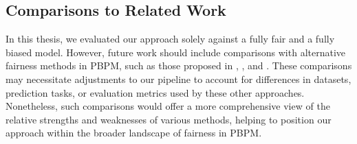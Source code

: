 \subsection{Comparisons to Related Work}
In this thesis, we evaluated our approach solely against a fully fair and a fully biased model.
However, future work should include comparisons with alternative fairness methods in PBPM,
such as those proposed in \cite{fairness_foundation}, \cite{fairness_adversarial}, and \cite{fairness_independence}.
These comparisons may necessitate adjustments to our pipeline to account for differences in datasets,
prediction tasks, or evaluation metrics used by these other approaches.
Nonetheless, such comparisons would offer a more comprehensive view
of the relative strengths and weaknesses of various methods,
helping to position our approach within the broader landscape of fairness in PBPM.


